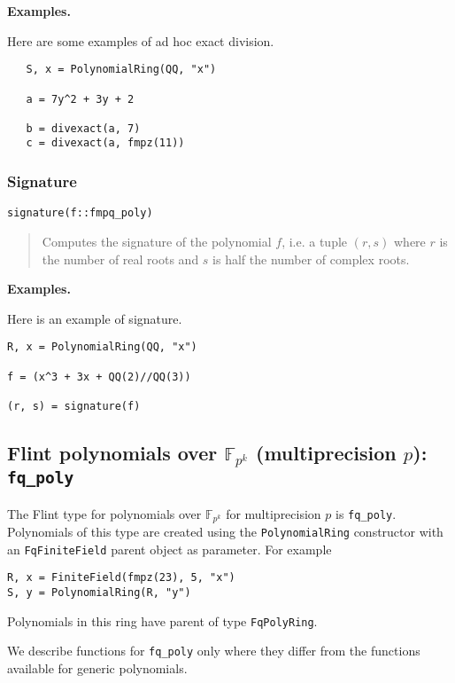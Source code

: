 \documentclass[a4paper,10pt]{article}
\newcommand{\F}{\mathbb{F}}
\newcommand{\code}{\lstinline}
\newcommand{\desc}[1]{\vspace{-3mm}\begin{quote}#1\end{quote}}
\begin{document}
{{\textbf{Examples.}

Here are some examples of ad hoc exact division.

\begin{lstlisting}
   S, x = PolynomialRing(QQ, "x")

   a = 7y^2 + 3y + 2

   b = divexact(a, 7)
   c = divexact(a, fmpz(11))
\end{lstlisting}

\subsubsection{Signature}

\begin{lstlisting}
signature(f::fmpq_poly)
\end{lstlisting}

\desc{Computes the signature of the polynomial $f$, i.e. a tuple $(r, s)$ where $r$ is
the number of real roots and $s$ is half the number of complex roots.}

\textbf{Examples.}

Here is an example of signature.

\begin{lstlisting}
R, x = PolynomialRing(QQ, "x")

f = (x^3 + 3x + QQ(2)//QQ(3))

(r, s) = signature(f)
\end{lstlisting}

\subsection{Flint polynomials over $\F_{p^k}$ (multiprecision $p$): \code{fq_poly}}

The Flint type for polynomials over $\F_{p^k}$ for multiprecision $p$ is \code{fq_poly}.
Polynomials of this type are created using the \code{PolynomialRing} constructor with
an \code{FqFiniteField} parent object as parameter. For example

\begin{lstlisting}
R, x = FiniteField(fmpz(23), 5, "x")
S, y = PolynomialRing(R, "y")
\end{lstlisting}

Polynomials in this ring have parent of type \code{FqPolyRing}.

We describe functions for \code{fq_poly} only where they differ from the functions
available for generic polynomials.

}}
\end{document}
